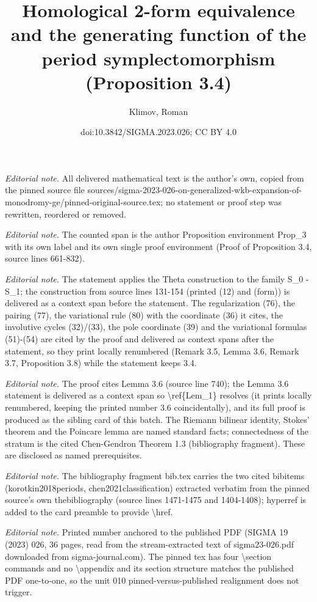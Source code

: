 \documentclass[10pt,a4paper]{article}
\title{Homological 2-form equivalence and the generating function of the period symplectomorphism (Proposition 3.4)}
\author{Klimov, Roman}
\date{doi:10.3842/SIGMA.2023.026; CC BY 4.0}
\numberwithin{equation}{section}
\theoremstyle{definition}
\begin{document}
\maketitle
\setcounter{section}{3}
\setcounter{Theorem}{3}
\noindent\textit{Editorial note.} All delivered mathematical text is the author's own, copied from the pinned source file sources/sigma-2023-026-on-generalized-wkb-expansion-of-monodromy-ge/pinned-original-source.tex; no statement or proof step was rewritten, reordered or removed.\par\medskip
\noindent\textit{Editorial note.} The counted span is the author Proposition environment Prop\_3 with its own label and its own single proof environment (Proof of Proposition 3.4, source lines 661-832).\par\medskip
\noindent\textit{Editorial note.} The statement applies the Theta construction to the family S\_0 - S\_1; the construction from source lines 131-154 (printed (12) and (form)) is delivered as a context span before the statement. The regularization (76), the pairing (77), the variational rule (80) with the coordinate (36) it cites, the involutive cycles (32)/(33), the pole coordinate (39) and the variational formulas (51)-(54) are cited by the proof and delivered as context spans after the statement, so they print locally renumbered (Remark 3.5, Lemma 3.6, Remark 3.7, Proposition 3.8) while the statement keeps 3.4.\par\medskip
\noindent\textit{Editorial note.} The proof cites Lemma 3.6 (source line 740); the Lemma 3.6 statement is delivered as a context span so \textbackslash{}ref\{Lem\_1\} resolves (it prints locally renumbered, keeping the printed number 3.6 coincidentally), and its full proof is produced as the sibling card of this batch. The Riemann bilinear identity, Stokes' theorem and the Poincare lemma are named standard facts; connectedness of the stratum is the cited Chen-Gendron Theorem 1.3 (bibliography fragment). These are disclosed as named prerequisites.\par\medskip
\noindent\textit{Editorial note.} The bibliography fragment bib.tex carries the two cited bibitems (korotkin2018periods, chen2021classification) extracted verbatim from the pinned source's own thebibliography (source lines 1471-1475 and 1404-1408); hyperref is added to the card preamble to provide \textbackslash{}href.\par\medskip
\noindent\textit{Editorial note.} Printed number anchored to the published PDF (SIGMA 19 (2023) 026, 36 pages, read from the stream-extracted text of sigma23-026.pdf downloaded from sigma-journal.com). The pinned tex has four \textbackslash{}section commands and no \textbackslash{}appendix and its section structure matches the published PDF one-to-one, so the unit 010 pinned-versus-published realignment does not trigger.\par\medskip
\end{document}
